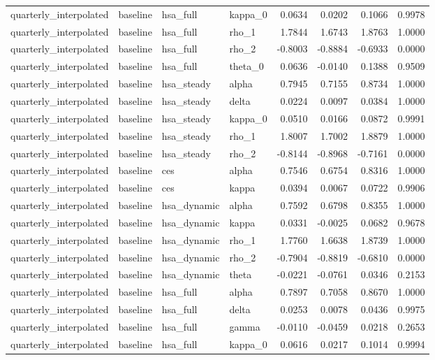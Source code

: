 \begin{tabular}{llllrrrr}
quarterly\_interpolated & baseline & hsa\_full & kappa\_0 & 0.0634 & 0.0202 & 0.1066 & 0.9978 \\
quarterly\_interpolated & baseline & hsa\_full & rho\_1 & 1.7844 & 1.6743 & 1.8763 & 1.0000 \\
quarterly\_interpolated & baseline & hsa\_full & rho\_2 & -0.8003 & -0.8884 & -0.6933 & 0.0000 \\
quarterly\_interpolated & baseline & hsa\_full & theta\_0 & 0.0636 & -0.0140 & 0.1388 & 0.9509 \\
quarterly\_interpolated & baseline & hsa\_steady & alpha & 0.7945 & 0.7155 & 0.8734 & 1.0000 \\
quarterly\_interpolated & baseline & hsa\_steady & delta & 0.0224 & 0.0097 & 0.0384 & 1.0000 \\
quarterly\_interpolated & baseline & hsa\_steady & kappa\_0 & 0.0510 & 0.0166 & 0.0872 & 0.9991 \\
quarterly\_interpolated & baseline & hsa\_steady & rho\_1 & 1.8007 & 1.7002 & 1.8879 & 1.0000 \\
quarterly\_interpolated & baseline & hsa\_steady & rho\_2 & -0.8144 & -0.8968 & -0.7161 & 0.0000 \\
quarterly\_interpolated & baseline & ces & alpha & 0.7546 & 0.6754 & 0.8316 & 1.0000 \\
quarterly\_interpolated & baseline & ces & kappa & 0.0394 & 0.0067 & 0.0722 & 0.9906 \\
quarterly\_interpolated & baseline & hsa\_dynamic & alpha & 0.7592 & 0.6798 & 0.8355 & 1.0000 \\
quarterly\_interpolated & baseline & hsa\_dynamic & kappa & 0.0331 & -0.0025 & 0.0682 & 0.9678 \\
quarterly\_interpolated & baseline & hsa\_dynamic & rho\_1 & 1.7760 & 1.6638 & 1.8739 & 1.0000 \\
quarterly\_interpolated & baseline & hsa\_dynamic & rho\_2 & -0.7904 & -0.8819 & -0.6810 & 0.0000 \\
quarterly\_interpolated & baseline & hsa\_dynamic & theta & -0.0221 & -0.0761 & 0.0346 & 0.2153 \\
quarterly\_interpolated & baseline & hsa\_full & alpha & 0.7897 & 0.7058 & 0.8670 & 1.0000 \\
quarterly\_interpolated & baseline & hsa\_full & delta & 0.0253 & 0.0078 & 0.0436 & 0.9975 \\
quarterly\_interpolated & baseline & hsa\_full & gamma & -0.0110 & -0.0459 & 0.0218 & 0.2653 \\
quarterly\_interpolated & baseline & hsa\_full & kappa\_0 & 0.0616 & 0.0217 & 0.1014 & 0.9994 \\

\end{tabular}
